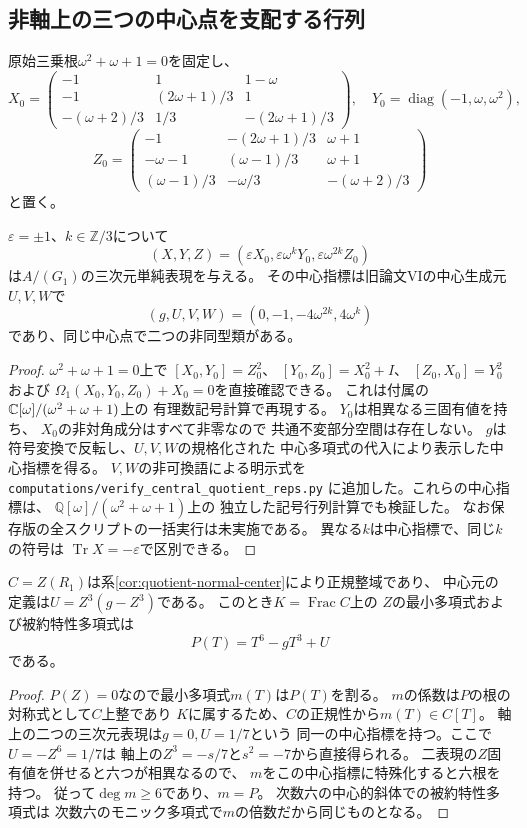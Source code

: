 \subsection{非軸上の三つの中心点を支配する行列}
原始三乗根$\omega^2+\omega+1=0$を固定し、
\[
 X_0=
 \begin{pmatrix}
 -1&1&1-\omega\\
 -1&(2\omega+1)/3&1\\
 -(\omega+2)/3&1/3&-(2\omega+1)/3
 \end{pmatrix},
 \quad Y_0=\operatorname{diag}(-1,\omega,\omega^2),
\]
\[
 Z_0=
 \begin{pmatrix}
 -1&-(2\omega+1)/3&\omega+1\\
 -\omega-1&(\omega-1)/3&\omega+1\\
 (\omega-1)/3&-\omega/3&-(\omega+2)/3
 \end{pmatrix}
\]
と置く。
\begin{proposition}[六つの非軸上表現]
\label{prop:local-six-nonaxial}
$\varepsilon=\pm1$、$k\in\mathbb Z/3$について
\[
 (X,Y,Z)=(\varepsilon X_0,\varepsilon\omega^kY_0,
                   \varepsilon\omega^{2k}Z_0)
\]
は$A/(G_1)$の三次元単純表現を与える。
その中心指標は旧論文VIの中心生成元$U,V,W$で
\[
 (g,U,V,W)=(0,-1,-4\omega^{2k},4\omega^k)
\]
であり、同じ中心点で二つの非同型類がある。
\end{proposition}
\begin{proof}
$\omega^2+\omega+1=0$上で
$[X_0,Y_0]=Z_0^2$、
$[Y_0,Z_0]=X_0^2+I$、
$[Z_0,X_0]=Y_0^2$および
$\Omega_1(X_0,Y_0,Z_0)+X_0=0$を直接確認できる。
これは付属の$\mathbb C[\omega]/(\omega^2+\omega+1)$上の
有理数記号計算で再現する。
$Y_0$は相異なる三固有値を持ち、
$X_0$の非対角成分はすべて非零なので
共通不変部分空間は存在しない。
$g$は符号変換で反転し、$U,V,W$の規格化された
中心多項式の代入により表示した中心指標を得る。
$V,W$の非可換語による明示式を
\texttt{computations/verify\_central\_quotient\_reps.py}
に追加した。これらの中心指標は、
$\mathbb Q[\omega]/(\omega^2+\omega+1)$上の
独立した記号行列計算でも検証した。
なお保存版の全スクリプトの一括実行は未実施である。
異なる$k$は中心指標で、同じ$k$の符号は
$\operatorname{Tr}X=-\varepsilon$で区別できる。
\end{proof}

\begin{lemma}[六次最小多項式の回復]
\label{lem:local-z-minpoly}
$C=Z(R_1)$は系\ref{cor:quotient-normal-center}により正規整域であり、
中心元の定義は$U=Z^3(g-Z^3)$である。
このとき$K=\operatorname{Frac}C$上の
$Z$の最小多項式および被約特性多項式は
\[
 P(T)=T^6-gT^3+U
\]
である。
\end{lemma}
\begin{proof}
$P(Z)=0$なので最小多項式$m(T)$は$P(T)$を割る。
$m$の係数は$P$の根の対称式として$C$上整であり
$K$に属するため、$C$の正規性から$m(T)\in C[T]$。
軸上の二つの三次元表現は$g=0,U=1/7$という
同一の中心指標を持つ。ここで$U=-Z^6=1/7$は
軸上の$Z^3=-s/7$と$s^2=-7$から直接得られる。
二表現の$Z$固有値を併せると六つが相異なるので、
$m$をこの中心指標に特殊化すると六根を持つ。
従って$\deg m\ge6$であり、$m=P$。
次数六の中心的斜体での被約特性多項式は
次数六のモニック多項式で$m$の倍数だから同じものとなる。
\end{proof}

